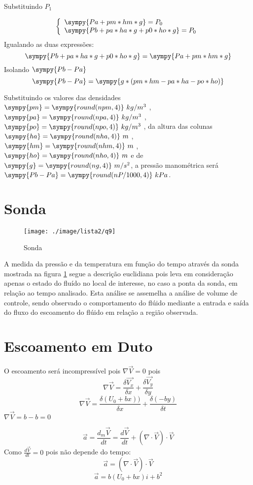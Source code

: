 \documentclass[a4paper,twocolumn,11pt]{article}
\newcommand{\npy}[1]{\sympy{round(n#1,4)}}
\newcommand{\nnpy}[1]{\sympy{#1} = \sympy{round(n#1,4)}}
\begin{document}
Substituindo $P_1$

$$
\left\{
\begin{array}{l}
\sympy{Pa + pm*hm*g} = P_0\\
\sympy{Pb + pa*ha*g + p0*ho*g} = P_0\\
\end{array}
\right.
$$
Igualando as duas expressões:
$$
\sympy{Pb + pa*ha*g + p0*ho*g} = \sympy{Pa + pm*hm*g}
$$
Isolando $\sympy{Pb-Pa}$
\begin{equation}
\sympy{Pb -Pa} = \sympy{g*(pm*hm-pa*ha-po*ho)}
\end{equation}

Substituindo os valores das densidades $\nnpy{pm}\ kg/m^3$ , $\nnpy{pa}\ kg/m^3$ , $\nnpy{po}\ kg/m^3$ , da altura das colunas $\nnpy{ha}\ m$ , $\nnpy{hm}\ m$ , $\nnpy{ho}\ m$ e de $\nnpy{g}\ m/s^2$, a pressão manométrica será $\sympy{Pb -Pa} = \npy{P/1000}\ kPa$.

\section{Sonda} %
\begin{figure}[H]
\centering
\label{fig:l2q9}
\texttt{[image: ./image/lista2/q9]}
\caption{Sonda}
\end{figure}

A medida da pressão e da temperatura em função do tempo através da sonda mostrada na figura \ref{fig:l2q9} segue a descrição euclidiana pois leva em consideração apenas o estado do fluído no local de interesse, no caso a ponta da sonda, em relação ao tempo analisado. Esta análise se assemelha a análise de volume de controle, sendo observado o comportamento do flúido mediante a entrada e saída do fluxo do escoamento do flúido em relação a região observada.

\section{Escoamento em Duto} %

O escoamento será incompressível pois $\nabla \vec{V} = 0$ pois
$$\nabla \vec{V} = \frac{\delta \vec{V_x}}{\delta x} + \frac{\delta \vec{V_y}}{\delta y}$$
$$\nabla \vec{V} = \frac{\delta (U_0+b x))}{\delta x} + \frac{\delta (-b y)}{\delta t}$$
$\nabla \vec{V} = b - b = 0$

\begin{equation}
\vec{a} = \frac{d_m \vec{V}}{dt} = \frac{d \vec{V}}{dt} + (\nabla\cdot\vec{V})\cdot\vec{V}
\end{equation}
Como $\frac{d \vec{V}}{dt} = 0$ pois não depende do tempo:
$$
\vec{a} = (\nabla\cdot\vec{V})\cdot\vec{V}
$$
$$
\vec{a} = b(U_0 + b x) i + b^2
$$
\end{document}
